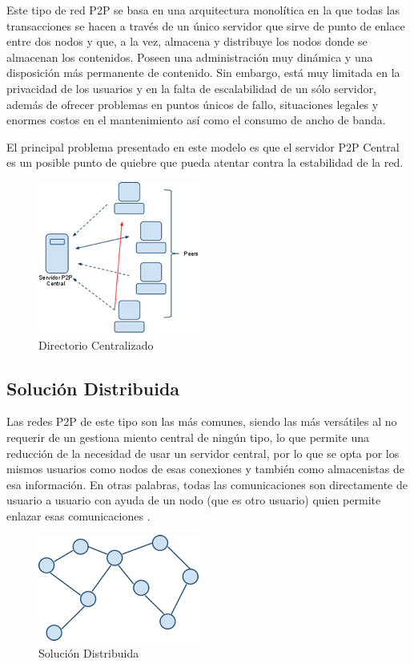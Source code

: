 Este tipo de red P2P se basa en una arquitectura monolítica en la que todas las transacciones se hacen a través de un único servidor que sirve de punto de enlace entre dos nodos y que, a la vez, almacena y distribuye los nodos donde se almacenan los contenidos. Poseen una administración muy dinámica y una disposición más permanente de contenido. Sin embargo, está muy limitada en la privacidad de los usuarios y en la falta de escalabilidad de un sólo servidor, además de ofrecer problemas en puntos únicos de fallo, situaciones legales y enormes costos en el mantenimiento así como el consumo de ancho de banda. \cite{wiki_p2p}

El principal problema presentado en este modelo es que el servidor P2P Central es un posible punto de quiebre que pueda atentar contra la estabilidad de la red.

\begin{figure}[h]
  \centering
    \includegraphics[scale=1]{gfx/p2p_central}
  \caption{Directorio Centralizado}
  \label{conexionhttp}
\end{figure}


\subsection{Solución Distribuida}

Las redes P2P de este tipo son las más comunes, siendo las más versátiles al no requerir de un gestiona miento central de ningún tipo, lo que permite una reducción de la necesidad de usar un servidor central, por lo que se opta por los mismos usuarios como nodos de esas conexiones y también como almacenistas de esa información. En otras palabras, todas las comunicaciones son directamente de usuario a usuario con ayuda de un nodo (que es otro usuario) quien permite enlazar esas comunicaciones \cite{wiki_p2p}.

\begin{figure}[h]
  \centering
    \includegraphics[scale=1]{gfx/p2p_distribuido}
  \caption{Solución Distribuida}
  \label{conexionhttp}
\end{figure}

